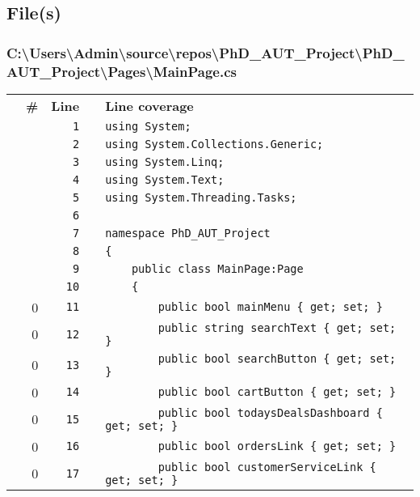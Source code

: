 \documentclass[a4paper,landscape,10pt]{article}
\begin{document}
\subsection{File(s)}
\subsubsection{C:\textbackslash Users\textbackslash Admin\textbackslash source\textbackslash repos\textbackslash PhD\_AUT\_Project\textbackslash PhD\_AUT\_Project\textbackslash Pages\textbackslash MainPage.cs}
\begin{longtable}[l]{lrrll}
\textbf{} & \textbf{\#} & \textbf{Line} & \textbf{} & \textbf{Line coverage}\\
\cellcolor{gray} &  & \verb~1~ & & \verb~using System;~\\
\cellcolor{gray} &  & \verb~2~ & & \verb~using System.Collections.Generic;~\\
\cellcolor{gray} &  & \verb~3~ & & \verb~using System.Linq;~\\
\cellcolor{gray} &  & \verb~4~ & & \verb~using System.Text;~\\
\cellcolor{gray} &  & \verb~5~ & & \verb~using System.Threading.Tasks;~\\
\cellcolor{gray} &  & \verb~6~ & & \verb~~\\
\cellcolor{gray} &  & \verb~7~ & & \verb~namespace PhD_AUT_Project~\\
\cellcolor{gray} &  & \verb~8~ & & \verb~{~\\
\cellcolor{gray} &  & \verb~9~ & & \verb~    public class MainPage:Page~\\
\cellcolor{gray} &  & \verb~10~ & & \verb~    {~\\
\cellcolor{red} & 0 & \verb~11~ & & \verb~        public bool mainMenu { get; set; }~\\
\cellcolor{red} & 0 & \verb~12~ & & \verb~        public string searchText { get; set; }~\\
\cellcolor{red} & 0 & \verb~13~ & & \verb~        public bool searchButton { get; set; }~\\
\cellcolor{red} & 0 & \verb~14~ & & \verb~        public bool cartButton { get; set; }~\\
\cellcolor{red} & 0 & \verb~15~ & & \verb~        public bool todaysDealsDashboard { get; set; }~\\
\cellcolor{red} & 0 & \verb~16~ & & \verb~        public bool ordersLink { get; set; }~\\
\cellcolor{red} & 0 & \verb~17~ & & \verb~        public bool customerServiceLink { get; set; }~\\

\end{longtable}
\end{document}
